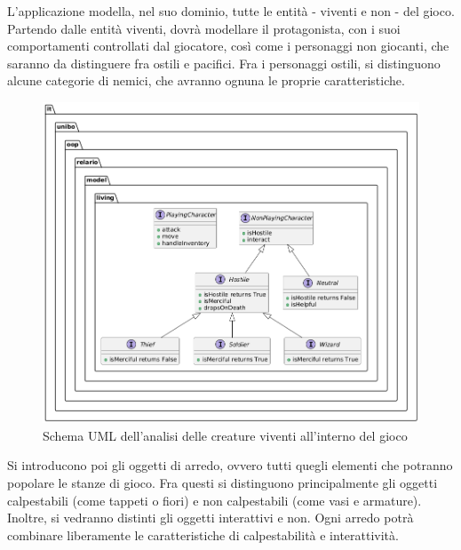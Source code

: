 \documentclass[a4paper,12pt]{report}
\begin{document}
L'applicazione modella, nel suo dominio, tutte le entità - viventi e non - del gioco.
%
Partendo dalle entità viventi, dovrà modellare il protagonista, con i suoi comportamenti controllati dal giocatore, 
così come i personaggi non giocanti, che saranno da distinguere fra ostili e pacifici. Fra i personaggi ostili,
si distinguono alcune categorie di nemici, che avranno ognuna le proprie caratteristiche.
%
\begin{figure}[H]
	\centering{}
	\includegraphics[width=\textwidth]{img/LivingBeings.png}
	\caption{Schema UML dell'analisi delle creature viventi all'interno del gioco}
	\label{img:livingBeingsAnalysis}
\end{figure}
%
Si introducono poi gli oggetti di arredo, ovvero tutti quegli elementi che potranno popolare le stanze di gioco.
Fra questi si distinguono principalmente gli oggetti calpestabili (come tappeti o fiori) e non calpestabili (come vasi
e armature). Inoltre, si vedranno distinti gli oggetti interattivi e non. Ogni arredo potrà combinare liberamente le
caratteristiche di calpestabilità e interattività.
%
\end{document}
